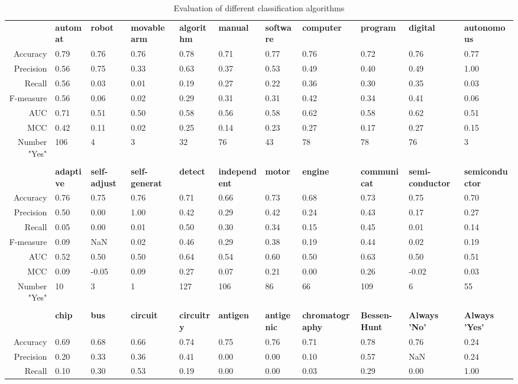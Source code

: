 \begin{table}
\begin{small}
\begin{threeparttable}
\caption{{\normalsize Evaluation of different classification algorithms}}
\label{table:table_compare_classalg}
\begin{tabular}{rllllllllll}
\toprule 
 & \textbf{automat} & \textbf{robot} & \textbf{movable arm} & \textbf{algorithm} & \textbf{manual} & \textbf{software} & \textbf{computer} & \textbf{program} & \textbf{digital} & \textbf{autonomous}  \tabularnewline 
Accuracy & 0.79 & 0.76 & 0.76 & 0.78 & 0.71 & 0.77 & 0.76 & 0.72 & 0.76 & 0.77  \tabularnewline 
Precision & 0.56 & 0.75 & 0.33 & 0.63 & 0.37 & 0.53 & 0.49 & 0.40 & 0.49 & 1.00  \tabularnewline 
Recall & 0.56 & 0.03 & 0.01 & 0.19 & 0.27 & 0.22 & 0.36 & 0.30 & 0.35 & 0.03  \tabularnewline 
F-measure & 0.56 & 0.06 & 0.02 & 0.29 & 0.31 & 0.31 & 0.42 & 0.34 & 0.41 & 0.06  \tabularnewline 
AUC & 0.71 & 0.51 & 0.50 & 0.58 & 0.56 & 0.58 & 0.62 & 0.58 & 0.62 & 0.51  \tabularnewline 
MCC & 0.42 & 0.11 & 0.02 & 0.25 & 0.14 & 0.23 & 0.27 & 0.17 & 0.27 & 0.15  \tabularnewline 
Number "Yes" & 106 & 4 & 3 & 32 & 76 & 43 & 78 & 78 & 76 & 3  \tabularnewline 
\tabularnewline 
 & \textbf{adaptive} & \textbf{self-adjust} & \textbf{self-generat} & \textbf{detect} & \textbf{independent} & \textbf{motor} & \textbf{engine} & \textbf{communicat} & \textbf{semi-conductor} & \textbf{semiconductor}  \tabularnewline 
Accuracy & 0.76 & 0.75 & 0.76 & 0.71 & 0.66 & 0.73 & 0.68 & 0.73 & 0.75 & 0.70  \tabularnewline 
Precision & 0.50 & 0.00 & 1.00 & 0.42 & 0.29 & 0.42 & 0.24 & 0.43 & 0.17 & 0.27  \tabularnewline 
Recall & 0.05 & 0.00 & 0.01 & 0.50 & 0.30 & 0.34 & 0.15 & 0.45 & 0.01 & 0.14  \tabularnewline 
F-measure & 0.09 & NaN & 0.02 & 0.46 & 0.29 & 0.38 & 0.19 & 0.44 & 0.02 & 0.19  \tabularnewline 
AUC & 0.52 & 0.50 & 0.50 & 0.64 & 0.54 & 0.60 & 0.50 & 0.63 & 0.50 & 0.51  \tabularnewline 
MCC & 0.09 & -0.05 & 0.09 & 0.27 & 0.07 & 0.21 & 0.00 & 0.26 & -0.02 & 0.03  \tabularnewline 
Number "Yes" & 10 & 3 & 1 & 127 & 106 & 86 & 66 & 109 & 6 & 55  \tabularnewline 
\tabularnewline 
 & \textbf{chip} & \textbf{bus} & \textbf{circuit} & \textbf{circuitry} & \textbf{antigen} & \textbf{antigenic} & \textbf{chromatography} & \textbf{Bessen-Hunt} & \textbf{Always 'No'} & \textbf{Always 'Yes'}  \tabularnewline 
Accuracy & 0.69 & 0.68 & 0.66 & 0.74 & 0.75 & 0.76 & 0.71 & 0.78 & 0.76 & 0.24  \tabularnewline 
Precision & 0.20 & 0.33 & 0.36 & 0.41 & 0.00 & 0.00 & 0.10 & 0.57 & NaN & 0.24  \tabularnewline 
Recall & 0.10 & 0.30 & 0.53 & 0.19 & 0.00 & 0.00 & 0.03 & 0.29 & 0.00 & 1.00  \tabularnewline 

\end{tabular}
\end{threeparttable}
\end{small}
\end{table}
